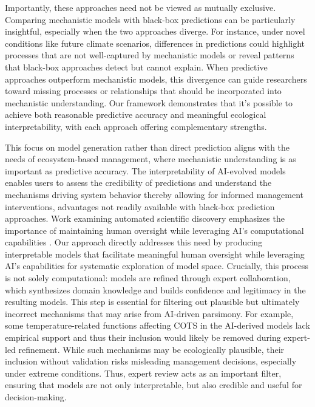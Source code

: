 Importantly, these approaches need not be viewed as mutually exclusive. Comparing mechanistic models with black-box predictions can be particularly insightful, especially when the two approaches diverge. For instance, under novel conditions like future climate scenarios, differences in predictions could highlight processes that are not well-captured by mechanistic models or reveal patterns that black-box approaches detect but cannot explain. When predictive approaches outperform mechanistic models, this divergence can guide researchers toward missing processes or relationships that should be incorporated into mechanistic understanding. Our framework demonstrates that it's possible to achieve both reasonable predictive accuracy and meaningful ecological interpretability, with each approach offering complementary strengths.

This focus on model generation rather than direct prediction aligns with the needs of ecosystem-based management, where mechanistic understanding is as important as predictive accuracy. The interpretability of AI-evolved models enables users to assess the credibility of predictions and understand the mechanisms driving system behavior thereby allowing for informed management interventions, advantages not readily available with black-box prediction approaches. Work examining automated scientific discovery emphasizes the importance of maintaining human oversight while leveraging AI's computational capabilities \citep{kramer2023automated,Spillias2024}. Our approach directly addresses this need by producing interpretable models that facilitate meaningful human oversight while leveraging AI's capabilities for systematic exploration of model space. Crucially, this process is not solely computational: models are refined through expert collaboration, which synthesizes domain knowledge and builds confidence and legitimacy in the resulting models. This step is essential for filtering out plausible but ultimately incorrect mechanisms that may arise from AI-driven parsimony. For example, some temperature-related functions affecting COTS in the AI-derived models lack empirical support and thus their inclusion would likely be removed during expert-led refinement. While such mechanisms may be ecologically plausible, their inclusion without validation risks misleading management decisions, especially under extreme conditions. Thus, expert review acts as an important filter, ensuring that models are not only interpretable, but also credible and useful for decision-making.

